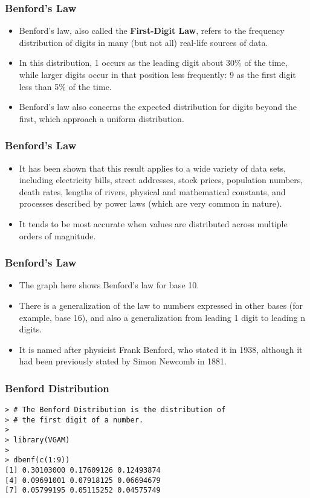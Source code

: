 \documentclass[MAIN.tex]{subfiles}
\begin{document}
 
\begin{frame}
	\frametitle{Benford's Law}
\begin{itemize}
\item Benford's law, also called the \textbf{First-Digit Law}, refers to the frequency distribution of digits in many (but not all) real-life sources of data. 
\item In this distribution, 1 occurs as the leading digit about 30\% of the time, while larger digits occur in that position less frequently: 9 as the first digit less than 5\% of the time. 
\item Benford's law also concerns the expected distribution for digits beyond the first, which approach a uniform distribution.
\end{itemize}
\end{frame}
\begin{frame}
	\frametitle{Benford's Law}
\begin{itemize}
\item It has been shown that this result applies to a wide variety of data sets, including electricity bills, street addresses, stock prices, population numbers, death rates, lengths of rivers, physical and mathematical constants, and processes described by power laws (which are very common in nature). \item It tends to be most accurate when values are distributed across multiple orders of magnitude.
\end{itemize}
\end{frame}
\begin{frame}
\frametitle{Benford's Law}
\large
\begin{itemize}
\item The graph here shows Benford's law for base 10. 
\item There is a generalization of the law to numbers expressed in other bases (for example, base 16), and also a generalization from leading 1 digit to leading n digits.
\item It is named after physicist Frank Benford, who stated it in 1938, although it had been previously stated by Simon Newcomb in 1881.
\end{itemize}
\end{frame}
\begin{frame}[fragile]
\frametitle{Benford Distribution}
\begin{framed}
\begin{verbatim}
> # The Benford Distribution is the distribution of 
> # the first digit of a number. 
>
> library(VGAM)
>
> dbenf(c(1:9))
[1] 0.30103000 0.17609126 0.12493874 
[4] 0.09691001 0.07918125 0.06694679
[7] 0.05799195 0.05115252 0.04575749
\end{verbatim}
\end{framed}
\end{frame}
\end{document}
